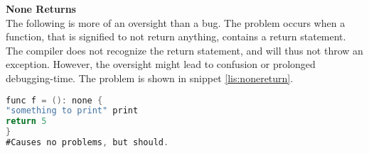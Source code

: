 \textbf{None Returns}\\
The following is more of an oversight than a bug. 
The problem occurs when a function, that is signified to not return anything, contains a return statement. 
The compiler does not recognize the return statement, and will thus not throw an exception. 
However, the oversight might lead to confusion or prolonged debugging-time. 
The problem is shown in snippet \ref{lis:nonereturn}.
\begin{lstlisting}[language=Kotlin,label=lis:nonereturn,caption=Returning from a none-function.]
func f = (): none { 
"something to print" print
return 5 
} 
#Causes no problems, but should.
\end{lstlisting}


